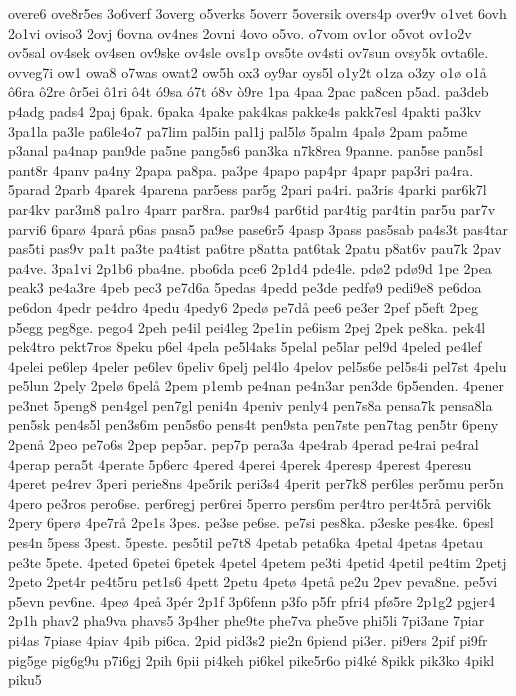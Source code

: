 {overe6
ove8r5es
3o6verf
3overg
o5verks
5overr
5oversik
overs4p
over9v
o1vet
6ovh
2o1vi
oviso3
2ovj
6ovna
ov4nes
2ovni
4ovo
o5vo.
o7vom
ov1or
o5vot
ov1o2v
ov5sal
ov4sek
ov4sen
ov9ske
ov4sle
ovs1p
ovs5te
ov4sti
ov7sun
ovsy5k
ovta6le.
ovveg7i
ow1
owa8
o7was
owat2
ow5h
ox3
oy9ar
oys5l
o1y2t
o1za
o3zy
o1ø
o1å
ô6ra
ô2re
ôr5ei
ô1ri
ô4t
ó9sa
ó7t
ó8v
ò9re
1pa
4paa
2pac
pa8cen
p5ad.
pa3deb
p4adg
pads4
2paj
6pak.
6paka
4pake
pak4kas
pakke4s
pakk7esl
4pakti
pa3kv
3pa1la
pa3le
pa6le4o7
pa7lim
pal5in
pal1j
pal5lø
5palm
4palø
2pam
pa5me
p3anal
pa4nap
pan9de
pa5ne
pang5s6
pan3ka
n7k8rea
9panne.
pan5se
pan5sl
pant8r
4panv
pa4ny
2papa
pa8pa.
pa3pe
4papo
pap4pr
4papr
pap3ri
pa4ra.
5parad
2parb
4parek
4parena
par5ess
par5g
2pari
pa4ri.
pa3ris
4parki
par6k7l
par4kv
par3m8
pa1ro
4parr
par8ra.
par9s4
par6tid
par4tig
par4tin
par5u
par7v
parvi6
6parø
4parå
p6as
pasa5
pa9se
pase6r5
4pasp
3pass
pas5sab
pa4s3t
pas4tar
pas5ti
pas9v
pa1t
pa3te
pa4tist
pa6tre
p8atta
pat6tak
2patu
p8at6v
pau7k
2pav
pa4ve.
3pa1vi
2p1b6
pba4ne.
pbo6da
pce6
2p1d4
pde4le.
pdø2
pdø9d
1pe
2pea
peak3
pe4a3re
4peb
pec3
pe7d6a
5pedas
4pedd
pe3de
pedfø9
pedi9e8
pe6doa
pe6don
4pedr
pe4dro
4pedu
4pedy6
2pedø
pe7då
pee6
pe3er
2pef
p5eft
2peg
p5egg
peg8ge.
pego4
2peh
pe4il
pei4leg
2pe1in
pe6ism
2pej
2pek
pe8ka.
pek4l
pek4tro
pekt7ros
8peku
p6el
4pela
pe5l4aks
5pelal
pe5lar
pel9d
4peled
pe4lef
4pelei
pe6lep
4peler
pe6lev
6peliv
6pelj
pel4lo
4pelov
pel5s6e
pel5s4i
pel7st
4pelu
pe5lun
2pely
2pelø
6pelå
2pem
p1emb
pe4nan
pe4n3ar
pen3de
6p5enden.
4pener
pe3net
5peng8
pen4gel
pen7gl
peni4n
4peniv
penly4
pen7s8a
pensa7k
pensa8la
pen5sk
pen4s5l
pen3s6m
pen5s6o
pens4t
pen9sta
pen7ste
pen7tag
pen5tr
6peny
2penå
2peo
pe7o6s
2pep
pep5ar.
pep7p
pera3a
4pe4rab
4perad
pe4rai
pe4ral
4perap
pera5t
4perate
5p6erc
4pered
4perei
4perek
4peresp
4perest
4peresu
4peret
pe4rev
3peri
perie8ns
4pe5rik
peri3s4
4perit
per7k8
per6les
per5mu
per5n
4pero
pe3ros
pero6se.
per6regj
per6rei
5perro
pers6m
per4tro
per4t5rå
pervi6k
2pery
6perø
4pe7rå
2pe1s
3pes.
pe3se
pe6se.
pe7si
pes8ka.
p3eske
pes4ke.
6pesl
pes4n
5pess
3pest.
5peste.
pes5til
pe7t8
4petab
peta6ka
4petal
4petas
4petau
pe3te
5pete.
4peted
6petei
6petek
4petel
4petem
pe3ti
4petid
4petil
pe4tim
2petj
2peto
2pet4r
pe4t5ru
pet1s6
4pett
2petu
4petø
4petå
pe2u
2pev
peva8ne.
pe5vi
p5evn
pev6ne.
4peø
4peå
3pér
2p1f
3p6fenn
p3fo
p5fr
pfri4
pfø5re
2p1g2
pgjer4
2p1h
phav2
pha9va
phavs5
3p4her
phe9te
phe7va
phe5ve
phi5li
7pi3ane
7piar
pi4as
7piase
4piav
4pib
pi6ca.
2pid
pid3s2
pie2n
6piend
pi3er.
pi9ers
2pif
pi9fr
pig5ge
pig6g9u
p7i6gj
2pih
6pii
pi4keh
pi6kel
pike5r6o
pi4ké
8pikk
pik3ko
4pikl
piku5
}
